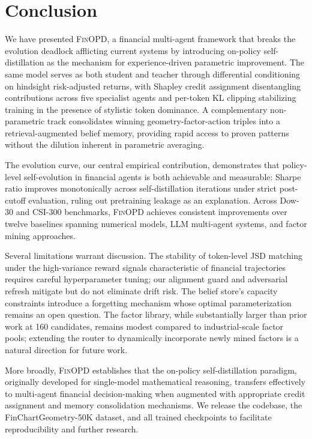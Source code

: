 \section{Conclusion}
\label{sec:conclusion}

We have presented \textsc{FinOPD}, a financial multi-agent framework that breaks the evolution deadlock afflicting current systems by introducing on-policy self-distillation as the mechanism for experience-driven parametric improvement. The same model serves as both student and teacher through differential conditioning on hindsight risk-adjusted returns, with Shapley credit assignment disentangling contributions across five specialist agents and per-token KL clipping stabilizing training in the presence of stylistic token dominance. A complementary non-parametric track consolidates winning geometry-factor-action triples into a retrieval-augmented belief memory, providing rapid access to proven patterns without the dilution inherent in parametric averaging.

The evolution curve, our central empirical contribution, demonstrates that policy-level self-evolution in financial agents is both achievable and measurable: Sharpe ratio improves monotonically across self-distillation iterations under strict post-cutoff evaluation, ruling out pretraining leakage as an explanation. Across Dow-30 and CSI-300 benchmarks, \textsc{FinOPD} achieves consistent improvements over twelve baselines spanning numerical models, LLM multi-agent systems, and factor mining approaches.

Several limitations warrant discussion. The stability of token-level JSD matching under the high-variance reward signals characteristic of financial trajectories requires careful hyperparameter tuning; our alignment guard and adversarial refresh mitigate but do not eliminate drift risk. The belief store's capacity constraints introduce a forgetting mechanism whose optimal parameterization remains an open question. The factor library, while substantially larger than prior work at 160 candidates, remains modest compared to industrial-scale factor pools; extending the router to dynamically incorporate newly mined factors is a natural direction for future work.

More broadly, \textsc{FinOPD} establishes that the on-policy self-distillation paradigm, originally developed for single-model mathematical reasoning, transfers effectively to multi-agent financial decision-making when augmented with appropriate credit assignment and memory consolidation mechanisms. We release the codebase, the FinChartGeometry-50K dataset, and all trained checkpoints to facilitate reproducibility and further research.
